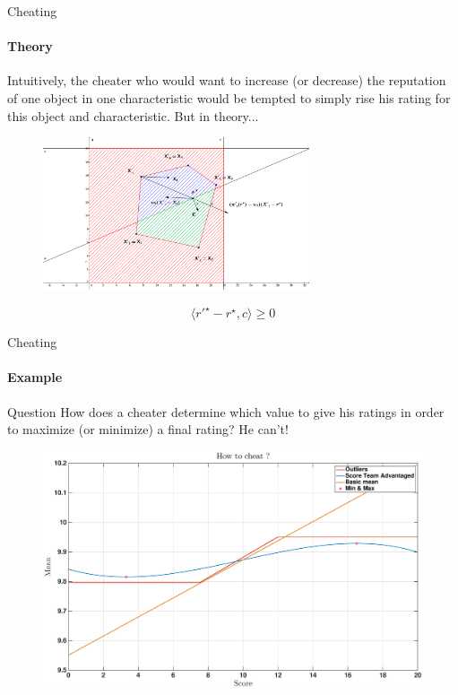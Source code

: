 
\begin{frame}{Cheating}
\framesubtitle{Theory}

        Intuitively, the cheater who would want to increase (or decrease) the reputation of one object in one characteristic would be tempted to simply rise his rating for this object and characteristic. But in theory...
        
        \begin{figure}
            \centering
            \includegraphics[width=0.7\textwidth]{../rapport/images/geogebra/Hyperplane.png}
        \end{figure}
        
    \[
        \langle r'^{\star} - r^{\star}, c \rangle \geq 0    
    \]        
        
\end{frame}

\begin{frame}{Cheating}
\framesubtitle{Example}
        \begin{exampleblock}{Question}
            How does a cheater determine which value to give his ratings in order to maximize (or minimize) a final rating? He can't!
        \end{exampleblock}
        
        \begin{figure}
            \centering
            \includegraphics[width=\textwidth]{../rapport/images/cheaters/howto.eps}
        \end{figure}
\end{frame}

